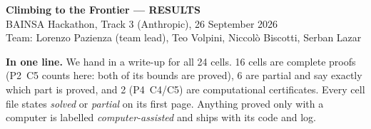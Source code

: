 \documentclass[10pt]{article}
\begin{document}
\begin{center}
{\Large\bfseries Climbing to the Frontier --- RESULTS}\\[2pt]
BAINSA Hackathon, Track 3 (Anthropic), 26 September 2026\\
Team: Lorenzo Pazienza (team lead), Teo Volpini, Niccol\`o Biscotti, Serban Lazar
\end{center}

\noindent\textbf{In one line.} We hand in a write-up for all 24 cells. 16 cells are complete proofs (P2~C5 counts here: both of its bounds are proved), 6 are partial and say exactly which part is proved, and 2 (P4~C4/C5) are computational certificates. Every cell file states \emph{solved} or \emph{partial} on its first page. Anything proved only with a computer is labelled \emph{computer-assisted} and ships with its code and log.
\end{document}

